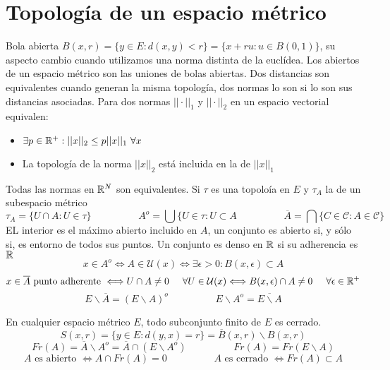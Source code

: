\section{Topología de un espacio métrico}
Bola abierta $B(x,r) = \{y\in E : d(x,y)<r \} = \{x+ru : u\in B(0,1) \}$, su aspecto cambio cuando utilizamos una norma distinta de la euclídea.
Los abiertos de un espacio métrico son las uniones de bolas abiertas.
Dos distancias son equivalentes cuando generan la misma topología, dos normas lo son si lo son sus distancias asociadas.
Para dos normas $||\cdot||_1$ y $||\cdot||_2$ en un espacio vectorial equivalen:
\begin{itemize}
	\item $\exists p\in\mathbb{R}^+ : ||x||_2\leq p||x||_1 \ \forall x$
	\item La topología de la norma $||x||_2$ está incluida en la de $||x||_1$
\end{itemize}
Todas las normas en $\mathbb{R}^N$ son equivalentes.
Si $\tau$ es una topoloía en $E$ y $\tau_A$ la de un subespacio métrico
$$ \tau_A = \{ U\cap A : U\in\tau \} \hspace{2cm}
A^o = \bigcup \{U\in\tau : U\subset A \hspace{2cm}
\overline{A} = \bigcap \{ C\in\mathcal{C} : A\in\mathcal{C} \}$$
EL interior es el máximo abierto incluido en $A$, un conjunto es abierto si, y sólo si, es entorno de todos sus puntos. Un conjunto es denso en $\mathbb{R}$ si su adherencia es $\mathbb{R}$
$$ x\in A^o \Longleftrightarrow A\in\mathcal{U}(x)
\Longleftrightarrow \exists\epsilon>0 : B(x,\epsilon)\subset A $$
$$ x\in\overline{A}\text{ punto adherente } \Longleftrightarrow
U\cap A \not =0 \hspace{0.5cm} \forall U\in\mathcal{U}(x)\Longleftrightarrow
B(x,\epsilon)\cap A \not=0 \hspace{0.5cm} \forall\epsilon\in\mathbb{R}^+ $$
$$ E\backslash \overline{A} = (E\backslash A)^o \hspace{2cm}
 E\backslash A^o = \overline{E\backslash A}$$


En cualquier espacio métrico $E$, todo subconjunto finito de $E$ es cerrado. 
$$ S(x,r) = \{ y\in E : d(y,x)=r \} = \overline{B}(x,r) \backslash B(x,r) $$
$$ Fr(A) = \overline{A}\backslash A^o = \overline{A}\cap (E\backslash A^o) \hspace{2cm}
Fr(A) = Fr(E\backslash A)  $$
$$ A \text{ es abierto } \Longleftrightarrow A\cap Fr(A) =0 \hspace{2cm}
A \text{ es cerrado }\Longleftrightarrow Fr(A)\subset A $$

